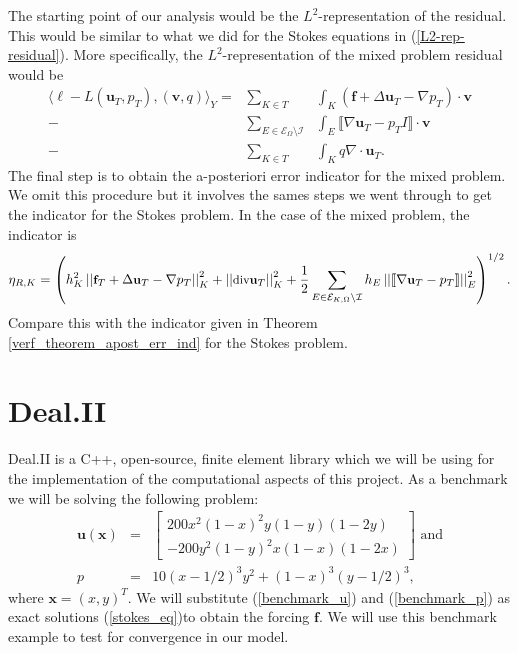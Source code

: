 \documentclass[12pt,a4paper]{article}
\theoremstyle{definition}
\begin{document}
The starting point of our analysis would be the $L^2$-representation of the residual.  This would be similar to what we did for the Stokes equations in (\ref{L2-rep-residual}).   More specifically, the $L^2$-representation of the mixed problem residual would be
\begin{eqnarray}\label{L2-rep-residual-mixed}
\langle \ell -L\left(\textbf{u}_T,p_T\right),\left(\textbf{v},q\right) \rangle_Y= &\sum_{K\in T}&\int_{K}\left(\textbf{f}+\Delta \textbf{u}_T-\nabla p_T\right)\cdot \textbf{v}\nonumber\\-&\sum_{E\in \mathcal{E}_{\Omega}\setminus\mathcal{I}}&\int_{E}\llbracket\nabla \textbf{u}_T-p_TI\rrbracket \cdot \textbf{v}\\
-&\sum_{K\in T}&\int_{K}q \nabla \cdot \textbf{u}_T. \nonumber
\end{eqnarray}
The final step is to obtain the a-posteriori error indicator for the mixed problem.  We omit this procedure but it involves the sames steps we went through to get the indicator for the Stokes problem.  In the case of the mixed problem, the indicator is
\begin{equation}\small
\eta_{R,K}=\left(h^2_K\left|\left|\textbf{f}_T+\Delta \textbf{u}_T-\nabla p_T\right|\right|^2_K+\left|\left|\text{div} \textbf{u}_T\right|\right|^2_K+\frac{1}{2}\sum_{E\in\mathcal{E}_{K,\Omega}\setminus\mathcal{I}}h_E\left|\left| \llbracket \nabla \textbf{u}_T -p_T \rrbracket \right|\right|_E^2\right)^{1/2}.
\end{equation}
Compare this with the indicator given in Theorem \ref{verf_theorem_apost_err_ind} for the Stokes problem.


\section{Deal.II}\label{sec_numerics}
Deal.II is a C++, open-source, finite element library which we will be using for the implementation of the computational aspects of this project.  As a benchmark we will be solving the following problem:
\begin{eqnarray}
\label{benchmark_u}
\textbf{u}\left(\textbf{x}\right)&=&\begin{bmatrix}
200x^2\left(1-x\right)^2y\left(1-y\right)\left(1-2y\right)  \\
-200y^2\left(1-y\right)^2x\left(1-x\right)\left(1-2x\right)  
\end{bmatrix} \text{ and}\\\label{benchmark_p}
p &=& 10\left(x-1/2\right)^3y^2+\left(1-x\right)^3\left(y-1/2\right)^3,
\end{eqnarray}
where $\textbf{x}=\left(x,y\right)^T$.    We will substitute (\ref{benchmark_u}) and (\ref{benchmark_p}) as exact solutions (\ref{stokes_eq})to obtain the forcing $\textbf{f}$.  We will use this benchmark example to test for convergence in our model.
\end{document}
